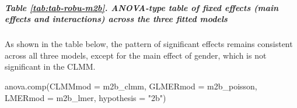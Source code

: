 \documentclass[
  bookmarksnumbered]{article}
\newenvironment{Shaded}{\begin{snugshade}}{\end{snugshade}}
\newcommand{\AttributeTok}[1]{\textcolor[rgb]{0.80,0.80,0.80}{#1}}
\newcommand{\FunctionTok}[1]{\textcolor[rgb]{0.94,0.94,0.56}{#1}}
\newcommand{\NormalTok}[1]{\textcolor[rgb]{0.80,0.80,0.80}{#1}}
\newcommand{\StringTok}[1]{\textcolor[rgb]{0.80,0.58,0.58}{#1}}
\begin{document}
\subparagraph{Table \ref{tab:tab-robu-m2b}. ANOVA-type table of fixed effects (main effects and interactions) across the three fitted models}\label{table-reftabtab-robu-m2b.-anova-type-table-of-fixed-effects-main-effects-and-interactions-across-the-three-fitted-models}

As shown in the table below, the pattern of significant effects remains consistent across all three models, except for the main effect of gender, which is not significant in the CLMM.

\begin{Shaded}
\begin{Highlighting}[]
\FunctionTok{anova.comp}\NormalTok{(}\AttributeTok{CLMMmod =}\NormalTok{ m2b\_clmm, }\AttributeTok{GLMERmod =}\NormalTok{ m2b\_poisson, }\AttributeTok{LMERmod =}\NormalTok{ m2b\_lmer, }\AttributeTok{hypothesis =} \StringTok{"2b"}\NormalTok{)}
\end{Highlighting}
\end{Shaded}
\end{document}
